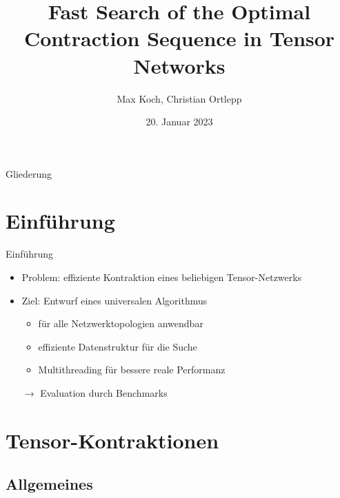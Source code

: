 \documentclass{beamer}
\title{Fast Search of the Optimal Contraction Sequence in Tensor Networks \cite{9325533}}
\author{Max Koch, Christian Ortlepp}
\institute{Friedrich-Schiller-Universität Jena}
\date{20. Januar 2023}
\begin{document}
\begin{frame}
	\titlepage
\end{frame}

\begin{frame}[allowframebreaks=0.8]{Gliederung}
	\tableofcontents
\end{frame}

\section{Einführung}

\begin{frame}{Einführung}
	\begin{itemize}
		\item Problem: effiziente Kontraktion eines beliebigen Tensor-Netzwerks
		\item Ziel: Entwurf eines universalen Algorithmus \begin{itemize}
				  \item für alle Netzwerktopologien anwendbar
			      \item effiziente Datenstruktur für die Suche
			      \item Multithreading für bessere reale Performanz
		      \end{itemize}
		\item[$\rightarrow$] Evaluation durch Benchmarks
	\end{itemize}
\end{frame}

\section{Tensor-Kontraktionen}
\subsection{Allgemeines}
\end{document}
